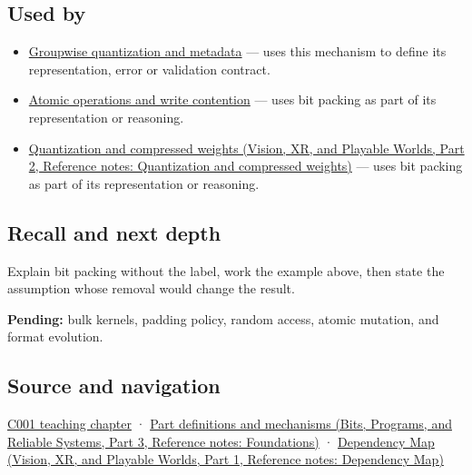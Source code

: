 \subsection{Used by}\label{appendix-1f9963e1a5d1-used-by}

\hypertarget{appendix-1f9963e1a5d1-used-by}{}

\begin{itemize}
\item
  \hyperref[appendix-638204c40e8b]{Groupwise quantization and metadata} --- uses this mechanism to define its representation, error or validation contract.
\item
  \hyperref[appendix-e12d1b03fefb]{Atomic operations and write contention} --- uses bit packing as part of its representation or reasoning.
\item
  \href{../07-Vision-XR-and-Playable-Worlds-P02/main.pdf\#appendix-fdc7879e8bf2}{Quantization and compressed weights (Vision, XR, and Playable Worlds, Part 2, Reference notes: Quantization and compressed weights)} --- uses bit packing as part of its representation or reasoning.
\end{itemize}

\subsection{Recall and next depth}\label{appendix-1f9963e1a5d1-recall-and-next-depth}

\hypertarget{appendix-1f9963e1a5d1-recall-and-next-depth}{}

Explain bit packing without the label, work the example above, then state the assumption whose removal would change the result.

\textbf{Pending:} bulk kernels, padding policy, random access, atomic mutation, and format evolution.

\subsection{Source and navigation}\label{appendix-1f9963e1a5d1-source-and-navigation}

\hypertarget{appendix-1f9963e1a5d1-source-and-navigation}{}

\hyperref[01-foundations-i-ch001-from-a-signal-to-an-interpretation]{C001 teaching chapter} · \href{../01-Bits-Programs-and-Reliable-Systems-P03/main.pdf\#appendix-fd090d982a15}{Part definitions and mechanisms (Bits, Programs, and Reliable Systems, Part 3, Reference notes: Foundations)} · \href{../07-Vision-XR-and-Playable-Worlds-P01/main.pdf\#appendix-4ad47bdd269a}{Dependency Map (Vision, XR, and Playable Worlds, Part 1, Reference notes: Dependency Map)}
